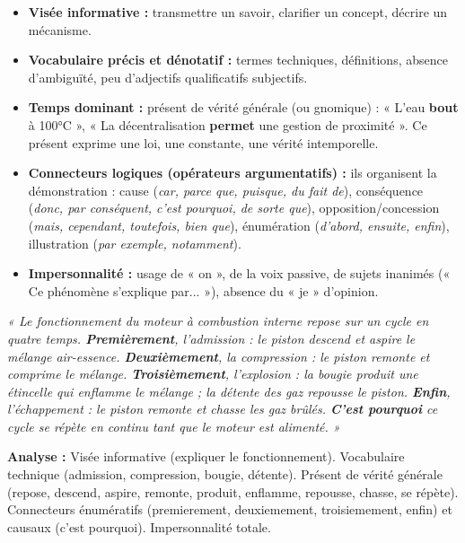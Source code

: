 \documentclass[11pt]{article}
\newcommand{\cle}[1]{{\popxbold\color{popdark}#1}}
\begin{document}
\begin{aretenir}
\begin{itemize}
    \item \textbf{Visée informative :} transmettre un savoir, clarifier un concept, décrire un mécanisme.
    \item \textbf{Vocabulaire précis et dénotatif :} termes techniques, définitions, absence d'ambiguïté, peu d'adjectifs qualificatifs subjectifs.
    \item \textbf{Temps dominant :} \cle{présent de vérité générale} (ou gnomique) : « L'eau \textbf{bout} à 100°C », « La décentralisation \textbf{permet} une gestion de proximité ». Ce présent exprime une loi, une constante, une vérité intemporelle.
    \item \textbf{Connecteurs logiques (opérateurs argumentatifs) :} ils organisent la démonstration : cause (\emph{car, parce que, puisque, du fait de}), conséquence (\emph{donc, par conséquent, c'est pourquoi, de sorte que}), opposition/concession (\emph{mais, cependant, toutefois, bien que}), énumération (\emph{d'abord, ensuite, enfin}), illustration (\emph{par exemple, notamment}).
    \item \textbf{Impersonnalité :} usage de « on », de la voix passive, de sujets inanimés (« Ce phénomène s'explique par... »), absence du « je » d'opinion.
\end{itemize}
\end{aretenir}

\begin{exemplebox}
\textit{« Le fonctionnement du moteur à combustion interne repose sur un cycle en quatre temps. \textbf{Premièrement}, l'admission : le piston descend et aspire le mélange air-essence. \textbf{Deuxièmement}, la compression : le piston remonte et comprime le mélange. \textbf{Troisièmement}, l'explosion : la bougie produit une étincelle qui enflamme le mélange ; la détente des gaz repousse le piston. \textbf{Enfin}, l'échappement : le piston remonte et chasse les gaz brûlés. \textbf{C'est pourquoi} ce cycle se répète en continu tant que le moteur est alimenté. »}
\par\medskip\noindent\textbf{Analyse :} Visée informative (expliquer le fonctionnement). Vocabulaire technique (admission, compression, bougie, détente). Présent de vérité générale (repose, descend, aspire, remonte, produit, enflamme, repousse, chasse, se répète). Connecteurs énumératifs (premierement, deuxiemement, troisiemement, enfin) et causaux (c'est pourquoi). Impersonnalité totale.
\end{exemplebox}
\end{document}
